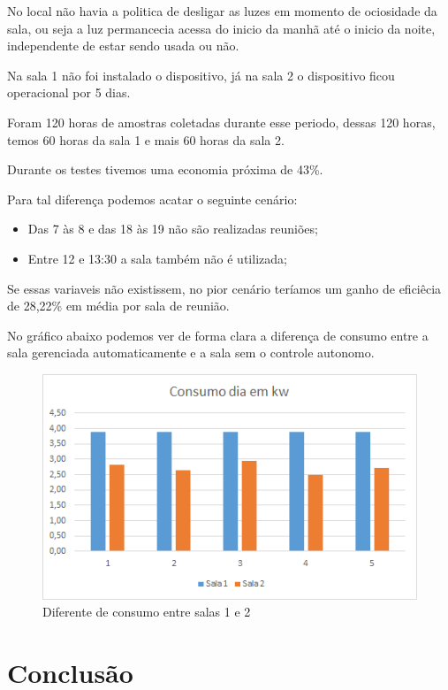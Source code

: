 \documentclass[openright]{normas-utf-tex} %
\begin{document}
No local não havia a politica de desligar as luzes em momento de ociosidade da sala, ou seja a luz permancecia acessa do inicio da manhã até o inicio da noite, independente de estar sendo usada ou não. 

Na sala 1 não foi instalado o dispositivo, já na sala 2 o dispositivo ficou operacional por 5 dias.

Foram 120 horas de amostras coletadas durante esse periodo, dessas 120 horas, temos 60 horas da sala 1 e mais 60 horas da sala 2.

Durante os testes tivemos uma economia próxima de 43\%.

Para tal diferença podemos acatar o seguinte cenário:

\begin{itemize}
    \item Das 7 às 8 e das 18 às 19 não são realizadas reuniões;
    \item Entre 12 e 13:30 a sala também não é utilizada;
\end{itemize}

Se essas variaveis não existissem, no pior cenário teríamos um ganho de eficiêcia de 28,22\% em média por sala de reunião.

No gráfico abaixo podemos ver de forma clara a diferença de consumo entre a sala gerenciada automaticamente e a sala sem o controle autonomo. 

\begin{figure}[!htb]
     \centering
     \includegraphics[scale=1]{g2.png}
     \caption{Diferente de consumo entre salas 1 e 2}
     \label{}
\end{figure}




\chapter{Conclusão}
\end{document}
